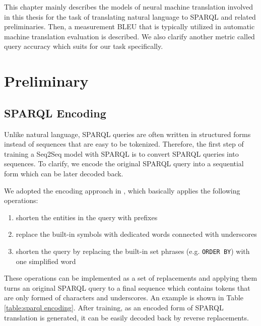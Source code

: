 
This chapter mainly describes the models of neural machine translation involved in this thesis for the task of translating natural language to SPARQL and related preliminaries. Then, a measurement BLEU that is typically utilized in automatic machine translation evaluation is described. We also clarify another metric called query accuracy which suits for our task specifically.

\section{Preliminary}

\subsection{SPARQL Encoding} \label{subsection:preprocessing}

Unlike natural language, SPARQL queries are often written in structured forms instead of sequences that are easy to be tokenized. Therefore, the first step of training a Seq2Seq model with SPARQL is to convert SPARQL queries into sequences. To clarify, we encode the original SPARQL query into a sequential form which can be later decoded back. 

We adopted the encoding approach in \cite{Soru2018a}, which basically applies the following operations:
\begin{enumerate}
\item shorten the entities in the query with prefixes
\item replace the built-in symbols with dedicated words connected with underscores
\item shorten the query by replacing the built-in set phrases (e.g. \texttt{ORDER BY}) with one simplified word
\end{enumerate}

These operations can be implemented as a set of replacements and applying them turns an original SPARQL query to a final sequence which contains tokens that are only formed of characters and underscores. An example is shown in Table \ref{table:sparql encoding}. After training, as an encoded form of SPARQL translation is generated, it can be easily decoded back by reverse replacements.

